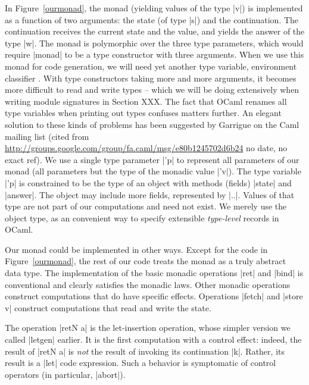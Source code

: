\documentclass[draft]{elsart}
\begin{document}
In Figure~\ref{ourmonad}, the monad (yielding values of the type |v|)
is implemented as a function of two
arguments: the state (of type |s|) and the continuation. The
continuation receives the current state and the value, and
yields the answer of the type |w|.  The monad is polymorphic over the
three type parameters, which would require |monad| to be a type
constructor with three arguments. When we use this monad for code
generation, we will need yet another type variable, environment
classifier \cite{taha-environment}. With type constructors taking more
and more arguments, it becomes more difficult to read and write
types -- which we will be doing extensively when writing module
signatures in Section XXX. The fact that OCaml renames all type
variables when printing out types confuses matters further. An elegant
solution to these kinds of problems has been suggested by 
Garrigue on the Caml mailing list 
(cited from
\url{http://groups.google.com/group/fa.caml/msg/e80b1245702d6b24}
no date, no exact ref). We use a single type parameter |'p| to
represent all parameters of our monad (all parameters but the type of
the monadic value |'v|). The type variable |'p| is constrained to be
the type of an object with methods (fields) |state| and |answer|. The
object may include more fields, represented by |..|. Values of that
type are not part of our computations and need not exist. We merely
use the object type, as an convenient way to specify extensible
\emph{type-level} records in OCaml.     

Our monad could be implemented in other ways. Except for the code in
Figure~\ref{ourmonad}, the rest of our code treats the monad as a
truly abstract data type. The implementation of the basic monadic
operations |ret| and |bind| is conventional and clearly satisfies the
monadic laws. Other monadic operations construct computations that do
have specific effects.  Operations |fetch| and |store v| construct
computations that read and write the state.

The operation |retN a| is the let-insertion operation, whose simpler
version we called |letgen| earlier. It is the first computation with
a control effect: indeed, the result of |retN a| is \emph{not} the
result of invoking its continuation |k|. Rather, its result is a |let|
code expression. Such a behavior is symptomatic of control operators
(in particular, |abort|).
\end{document}
